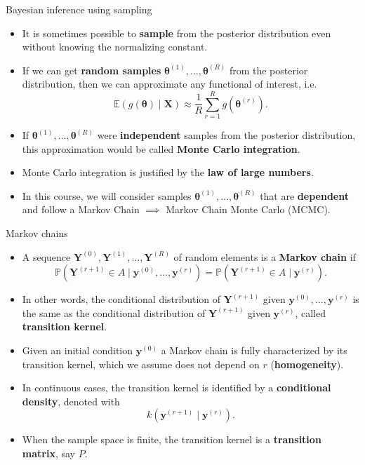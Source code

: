 \documentclass[
  9pt,
  ignorenonframetext,
]{beamer}
\begin{document}
\begin{frame}{Bayesian inference using sampling}
\protect\hypertarget{bayesian-inference-using-sampling}{}
\begin{itemize}
\item
  It is sometimes possible to \textbf{sample} from the posterior
  distribution even without knowing the normalizing constant.
\item
  If we can get \textbf{random samples}
  \(\bm{\theta}^{(1)}, \dots,\bm{\theta}^{(R)}\) from the posterior
  distribution, then we can approximate any functional of interest, i.e.
  \[
  \mathbb{E}(g(\bm{\theta}) \mid \bm{X}) \approx \frac{1}{R}\sum_{r=1}^R g(\bm{\theta}^{(r)}).
  \]
\item
  If \(\bm{\theta}^{(1)}, \dots,\bm{\theta}^{(R)}\) were
  \textbf{independent} samples from the posterior distribution, this
  approximation would be called \textbf{Monte Carlo integration}.
\item
  Monte Carlo integration is justified by the \textbf{law of large
  numbers}.
\item
  In this course, we will consider samples
  \(\bm{\theta}^{(1)}, \dots,\bm{\theta}^{(R)}\) that are
  \textbf{dependent} and follow a Markov Chain \(\implies\) Markov Chain
  Monte Carlo (MCMC).
\end{itemize}
\end{frame}

\begin{frame}{Markov chains}
\protect\hypertarget{markov-chains}{}
\begin{itemize}
\item
  A sequence \(\bm{Y}^{(0)}, \bm{Y}^{(1)}, \dots, \bm{Y}^{(R)}\) of
  random elements is a \textbf{Markov chain} if \[
  \mathbb{P}(\bm{Y}^{(r + 1)} \in A \mid \bm{y}^{(0)}, \dots, \bm{y}^{(r)}) = \mathbb{P}(\bm{Y}^{(r + 1)} \in A \mid\bm{y}^{(r)}). 
  \]
\item
  In other words, the conditional distribution of \(\bm{Y}^{(r + 1)}\)
  given \(\bm{y}^{(0)}, \dots, \bm{y}^{(r)}\) is the same as the
  conditional distribution of \(\bm{Y}^{(r + 1)}\) given
  \(\bm{y}^{(r)}\), called \textbf{transition kernel}.
\item
  Given an initial condition \(\bm{y}^{(0)}\) a Markov chain is fully
  characterized by its transition kernel, which we assume does not
  depend on \(r\) (\textbf{homogeneity}).
\item
  In continuous cases, the transition kernel is identified by a
  \textbf{conditional density}, denoted with \[
  k(\bm{y}^{(r+1)} \mid \bm{y}^{(r)}).
  \]
\item
  When the sample space is finite, the transition kernel is a
  \textbf{transition matrix}, say \(P\).
\end{itemize}
\end{frame}
\end{document}
